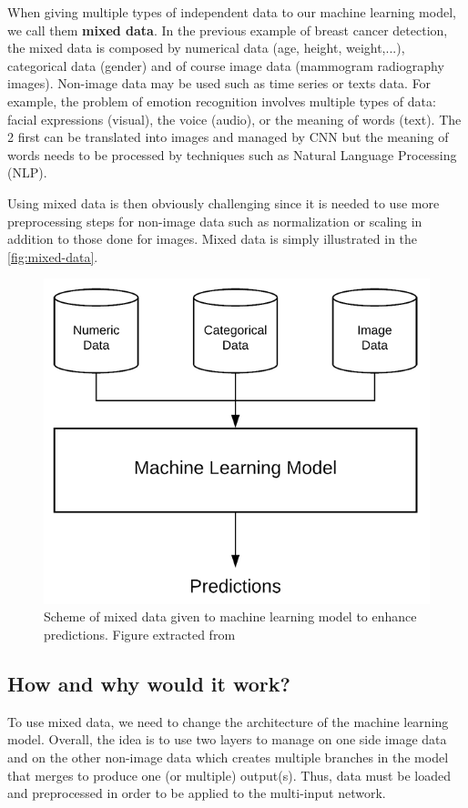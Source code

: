 \documentclass[11pt, openany]{report}
\theoremstyle{plain}
\theoremstyle{definition}
\theoremstyle{remark}
\begin{document}
When giving multiple types of independent data to our machine learning model, we call them \textbf{mixed data}. In the previous example of breast cancer detection, the mixed data is composed by numerical data (age, height, weight,...), categorical data (gender) and of course image data (mammogram radiography images). Non-image data may be used such as time series or texts data. For example, the problem of emotion recognition involves multiple types of data: facial expressions (visual), the voice (audio), or the meaning of words (text). The 2 first can be translated into images and managed by CNN but the meaning of words needs to be processed by techniques such as Natural Language Processing (NLP).  

Using mixed data is then obviously challenging since it is needed to use more preprocessing steps for non-image data such as normalization or scaling in addition to those done for images. Mixed data is simply illustrated in the \autoref{fig:mixed-data}. 

\begin{figure}[H]
  \centering
  \includegraphics[scale=0.5]{figures/mixed-data.png}
  \caption{Scheme of mixed data given to machine learning model to enhance predictions. Figure extracted from \cite{mixed-data}}
  \label{fig:mixed-data}
\end{figure}

\subsection{How and why would it work?}
To use mixed data, we need to change the architecture of the machine learning model. Overall, the idea is to use two layers to manage on one side image data and on the other non-image data which creates multiple branches in the model that merges to produce one (or multiple) output(s). Thus, data must be loaded and preprocessed in order to be applied to the multi-input network. 
\end{document}
